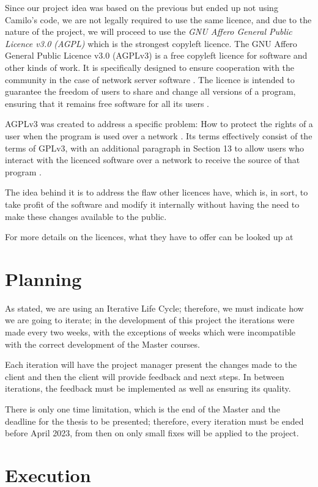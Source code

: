 Since our project idea was based on the previous but ended up not using Camilo's code, we are not legally required to use the same licence, and due to the nature of the project, we will proceed to use the \textit{GNU Affero General Public Licence v3.0 (AGPL)} which is the strongest copyleft licence. The GNU Affero General Public Licence v3.0 (AGPLv3) is a free copyleft licence for software and other kinds of work. It is specifically designed to ensure cooperation with the community in the case of network server software \cite{fsf1}. The licence is intended to guarantee the freedom of users to share and change all versions of a program, ensuring that it remains free software for all its users \cite{fsf1}.


 AGPLv3 was created to address a specific problem: How to protect the rights of a user when the program is used over a network \cite{fsf2}. Its terms effectively consist of the terms of GPLv3, with an additional paragraph in Section 13 to allow users who interact with the licenced software over a network to receive the source of that program \cite{fsf3}. 


The idea behind it is to address the flaw other licences have, which is, in sort, to take profit of the software and modify it internally without having the need to make these changes available to the public.


For more details on the licences, what they have to offer can be looked up at \cite{choosealicense}\cite{opensourceorg}
\section{Planning}
As stated, we are using an Iterative Life Cycle; therefore, we must indicate how we are going to iterate; in the development of this project the iterations were made every two weeks, with the exceptions of weeks which were incompatible with the correct development of the Master courses.

Each iteration will have the project manager present the changes made to the client and then the client will provide feedback and next steps. In between iterations, the feedback must be implemented as well as ensuring its quality.

There is only one time limitation, which is the end of the Master and the deadline for the thesis to be presented; therefore, every iteration must be ended before April 2023, from then on only small fixes will be applied to the project.
\section{Execution}
